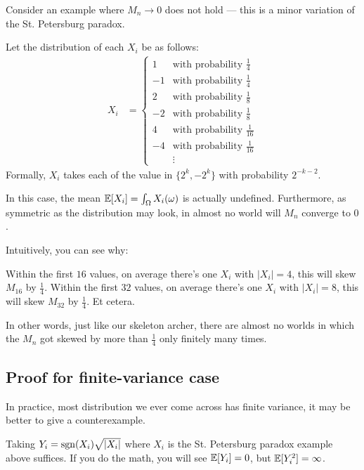 \begin{example}[The hypothesis {$\EE[X_i]=0$} is important]
	Consider an example where $M_n \to 0$ does not hold ---
	this is a minor variation of the St. Petersburg paradox.

	Let the distribution of each $X_i$ be as follows:
	\begin{align*}
		X_i &= \begin{cases}
			1&\text{with probability }\frac{1}{4} \\
			-1&\text{with probability }\frac{1}{4} \\
			2&\text{with probability }\frac{1}{8} \\
			-2&\text{with probability }\frac{1}{8} \\
			4&\text{with probability }\frac{1}{16} \\
			-4&\text{with probability }\frac{1}{16} \\
			&\vdots
		\end{cases}
	\end{align*}
	Formally, $X_i$ takes each of the value in $\{2^k,-2^k\}$ with probability $2^{-k-2}$.

	In this case, the mean $\mathbb E[X_i] = \int_\Omega X_i(\omega)$ is actually undefined.
	Furthermore, as symmetric as the distribution may look, in almost no world will $M_n$ converge
	to $0$.

	Intuitively, you can see why:
	\begin{itemize}
		\ii Within the first $16$ values, on average there's one $X_i$ with $|X_i|=4$,
		this will skew $M_{16}$ by $\frac{1}{4}$.
		\ii Within the first $32$ values, on average there's one $X_i$ with $|X_i|=8$,
		this will skew $M_{32}$ by $\frac{1}{4}$.
		\ii Et cetera.
	\end{itemize}
	In other words, just like our skeleton archer, there are almost no worlds in which the $M_n$
	got skewed by more than $\frac{1}{4}$ only finitely many times.
\end{example}

\subsection{Proof for finite-variance case}

In practice, most distribution we ever come across has finite variance,
it may be better to give a counterexample.

\begin{example}
	Taking $Y_i = \operatorname{sgn}(X_i) \sqrt{|X_i|}$ where $X_i$ is the St. Petersburg paradox example
	above suffices. If you do the math, you will see $\mathbb E[Y_i] = 0$, but $\mathbb E[Y_i^2] = \infty$.
\end{example}

